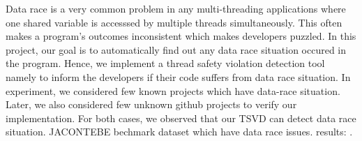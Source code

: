 Data race is a very common problem in any multi-threading applications where
one shared variable is accesssed by multiple threads simultaneously. This often
makes a program's outcomes inconsistent which makes developers puzzled. In this
project, our goal is to automatically find out any data race situation occured
in the program. Hence, we implement a thread safety violation detection tool
namely  to inform the developers if their code suffers from data
race situation.  In experiment, we considered few known projects which have
data-race situation. Later, we also considered few unknown github projects to
verify our implementation. For both cases, we observed that our TSVD can detect
data race situation. JACONTEBE bechmark dataset which have data race issues.
results: \TotalResults{}.

